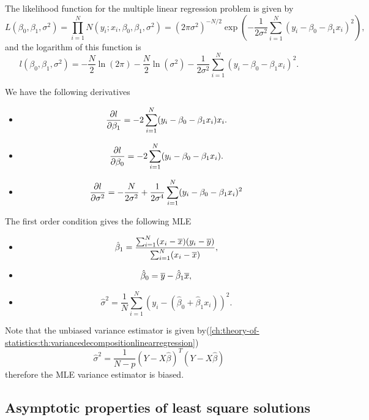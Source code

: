 \begin{refsection}
\begin{remark}
	
\end{remark}

\begin{corollary}
The likelihood function for the multiple linear regression problem is given by	
$$L(\beta_0,\beta_1, \sigma^2) = \prod_{i=1}^{N} N(y_i;x_i,\beta_0,\beta_1, \sigma^2) = (2\pi\sigma^2)^{-N/2}\exp(-\frac{1}{2\sigma^2}\sum_{i=1}^{N}(y_i-\beta_0-\beta_1x_i)^2),$$
and the logarithm of this function is
$$l(\beta_0,\beta_1, \sigma^2) = -\frac{N}{2}\ln(2\pi)-\frac{N}{2}\ln(\sigma^2) -\frac{1}{2\sigma^2}\sum_{i=1}^{N}(y_i-\beta_0-\beta_1x_i)^2.$$

We have the following derivatives
\begin{itemize}
	\item 
	$$\frac{\partial l}{\partial \beta_1} = -2\sum_{i=1}^{N}(y_i-\beta_0-\beta_1x_i)x_i.$$
	\item
	$$\frac{\partial l}{\partial \beta_0} = -2\sum_{i=1}^{N}(y_i-\beta_0-\beta_1x_i).$$
	\item 
	$$\frac{\partial l}{\partial \sigma^2} = -\frac{N}{2\sigma^2} + \frac{1}{2\sigma^4}\sum_{i=1}^{N}(y_i-\beta_0-\beta_1x_i)^2 $$
\end{itemize}	

The first order condition gives the following MLE
\begin{itemize}
	\item $$\hat{\beta}_1 = \frac{\sum_{i=1}^{N} (x_i-\overline{x})(y_i-\overline{y})}{\sum_{i=1}^{N}(x_i-\overline{x})},$$
	\item $$\hat{\beta}_0 = \overline{y} - \hat{\beta}_1\overline{x},$$
	\item $$\hat{\sigma}^2 = \frac{1}{N}\sum_{i=1}^{N}(y_i-(\hat{\beta}_0+\hat{\beta}_1x_i))^2.$$
\end{itemize}	
\end{corollary}

\begin{remark}
Note that the unbiased variance estimator is given by(\autoref{ch:theory-of-statistics:th:variancedecompositionlinearregression})
$$\hat{\sigma}^2 = \frac{1}{N-p}(Y-X\hat{\beta})^T(Y-X\hat{\beta})$$
therefore the MLE variance estimator is biased.
\end{remark}

\subsection{Asymptotic properties of least square solutions}


\end{refsection}
